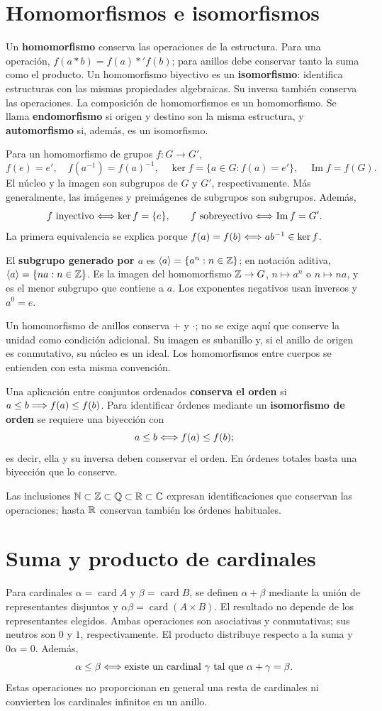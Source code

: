 \section{Homomorfismos e isomorfismos}
\label{sec:homomorfismos}
Un \textbf{homomorfismo} conserva las operaciones de la estructura.
Para una operación, $f(a*b)=f(a)*'f(b)$; para anillos debe conservar
tanto la suma como el producto. Un homomorfismo biyectivo es un
\textbf{isomorfismo}: identifica estructuras con las mismas propiedades
algebraicas. Su inversa también conserva las operaciones.
La composición de homomorfismos es un homomorfismo.
Se llama \textbf{endomorfismo} si origen y destino son la misma estructura,
y \textbf{automorfismo} si, además, es un isomorfismo.

Para un homomorfismo de grupos $f:G\to G'$,
\[
 f(e)=e',\quad f(a^{-1})=f(a)^{-1},\quad
 \ker f=\{a\in G:f(a)=e'\},\quad \operatorname{Im}f=f(G).
\]
El núcleo y la imagen son subgrupos de $G$ y $G'$, respectivamente.
Más generalmente, las imágenes y preimágenes de subgrupos son subgrupos.
Además,
\[
 f\text{ inyectivo}\Longleftrightarrow\ker f=\{e\},\qquad
 f\text{ sobreyectivo}\Longleftrightarrow\operatorname{Im}f=G'.
\]
La primera equivalencia se explica porque
$f(a)=f(b)\Longleftrightarrow ab^{-1}\in\ker f$.

El \textbf{subgrupo generado por $a$} es
$\langle a\rangle=\{a^n:n\in\mathbb{Z}\}$; en notación aditiva,
$\langle a\rangle=\{na:n\in\mathbb{Z}\}$. Es la imagen del homomorfismo
$\mathbb{Z}\to G$, $n\mapsto a^n$ o $n\mapsto na$, y es el menor subgrupo que
contiene a $a$. Los exponentes negativos usan inversos y $a^0=e$.

Un homomorfismo de anillos conserva $+$ y $\cdot$; no se exige aquí
que conserve la unidad como condición adicional. Su imagen es subanillo
y, si el anillo de origen es conmutativo, su núcleo es un ideal.
Los homomorfismos entre cuerpos se entienden con esta misma convención.

Una aplicación entre conjuntos ordenados \textbf{conserva el orden} si
$a\le b\Longrightarrow f(a)\le f(b)$. Para identificar órdenes mediante un
\textbf{isomorfismo de orden} se requiere una biyección con
\[
 a\le b\Longleftrightarrow f(a)\le f(b);
\]
es decir, ella y su inversa deben conservar el orden. En órdenes totales
basta una biyección que lo conserve.

Las inclusiones $\mathbb{N}\subset\mathbb{Z}\subset\mathbb{Q}\subset\mathbb{R}\subset\mathbb{C}$ expresan
identificaciones que conservan las operaciones; hasta $\mathbb{R}$ conservan
también los órdenes habituales.

\section{Suma y producto de cardinales}
Para cardinales $\alpha=\operatorname{card}A$ y $\beta=\operatorname{card}B$,
se definen $\alpha+\beta$ mediante la unión de representantes disjuntos
y $\alpha\beta=\operatorname{card}(A\times B)$.
El resultado no depende de los representantes elegidos.
Ambas operaciones son asociativas y conmutativas; sus neutros son $0$
y $1$, respectivamente. El producto distribuye respecto a la suma y
$0\alpha=0$. Además,
\[
 \alpha\le\beta\Longleftrightarrow \text{existe un cardinal }\gamma
 \text{ tal que }\alpha+\gamma=\beta.
\]
Estas operaciones no proporcionan en general una resta de cardinales
ni convierten los cardinales infinitos en un anillo.
